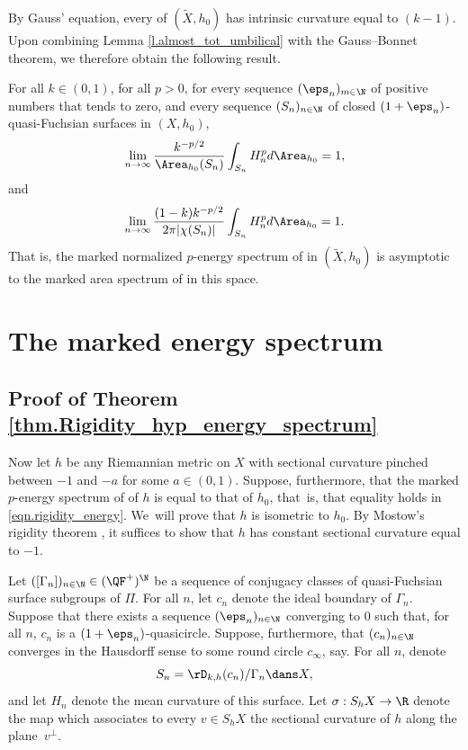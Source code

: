 By Gauss' equation, every \ksurface of $(\tilde{X},h_0)$ has intrinsic curvature equal to $(k-1)$. Upon combining Lemma \ref{l.almost_tot_umbilical} with the Gauss--Bonnet theorem, we therefore obtain the following result.

\begin{corollary}{}\label{corollarouille}
For all $k\in(0,1)$, for all $p>0$, for every sequence $(\eps_n)_{m\in\N}$ of positive numbers that tends to zero, and every sequence $(S_n)_{n\in\N}$ of closed $(1+\eps_n)$-quasi-Fuchsian surfaces in $(X,h_0)$,
\begin{equation*}
\lim_{n\to\infty}\frac{k^{-p/2}}{\Area_{h_0}(S_n)}\int_{S_n} H_n^p d\Area_{h_0}=1,
\end{equation*}
and
\begin{equation*}
\lim_{n\to\infty}\frac{(1-k)k^{-p/2}}{2\pi|\chi(S_n)|}\int_{S_n} H_n^p d\Area_{h_0}=1.
\end{equation*}
That is, the marked normalized $p$-energy spectrum of \ksurfaces in $(\tilde{X},h_0)$ is asymptotic to the marked area spectrum of \ksurfaces in this space.
\end{corollary}

\section{The marked energy spectrum}

\subsection{Proof of Theorem \ref{thm.Rigidity_hyp_energy_spectrum}}\label{ss.Rigidity}
Now let $h$ be any Riemannian metric on $X$ with sectional curvature pinched between $-1$ and $-a$ for some $a\in(0,1)$. Suppose, furthermore, that the marked $p$-energy spectrum of \ksurfaces of $h$ is equal to that of $h_0$, that~is, that equality holds in \eqref{eqn.rigidity_energy}. We~will prove that $h$ is isometric to $h_0$. By Mostow's rigidity theorem \cite{Mostow}, it suffices to show that $h$ has constant sectional curvature equal to $-1$.

Let $([\Gamma_n])_{n\in\N}\in(\QF^+)^\N$ be a sequence of conjugacy classes of quasi-Fuchsian surface subgroups of $\Pi$. For all $n$, let $c_n$ denote the ideal boundary of $\Gamma_n$. Suppose that there exists a sequence $(\eps_n)_{n\in\N}$ converging to $0$ such that, for all $n$, $c_n$ is a $(1+\eps_n)$-quasicircle. Suppose, furthermore, that $(c_n)_{n\in\N}$ converges in the Hausdorff sense to some round circle $c_\infty$, say. For all $n$, denote
\begin{equation*}
S_n=\rD_{k,h}(c_n)/\Gamma_n\dans X,
\end{equation*}
and let $H_n$ denote the mean curvature of this surface. Let $\sigma:S_hX\to\R$ denote the map which associates to every $v\in S_hX$ the sectional curvature of $h$ along the plane~$v^\perp$.


